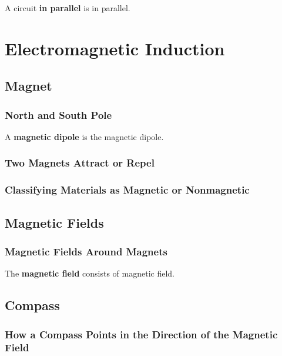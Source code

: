\documentclass[dvipsnames]{article}
\newif\ifShowUnitX                               %
\begin{document}
A circuit \textbf{\gls{in parallel}} is \glsdesc{in parallel}.



\fi

\clearpage

\section{Electromagnetic Induction}

\ifShowUnitX

\subsection{Magnet}

\subsubsection{North and South Pole}

A \textbf{\gls{magnetic dipole}} is the \glsdesc{magnetic dipole}.

\subsubsection{Two Magnets Attract or Repel}

\subsubsection{Classifying Materials as Magnetic or Nonmagnetic}

\subsection{Magnetic Fields}

\subsubsection{Magnetic Fields Around Magnets}

The \textbf{\gls{magnetic field}} consists of \glsdesc{magnetic field}.

\subsection{Compass}

\subsubsection{How a Compass Points in the Direction of the Magnetic Field}
\end{document}
